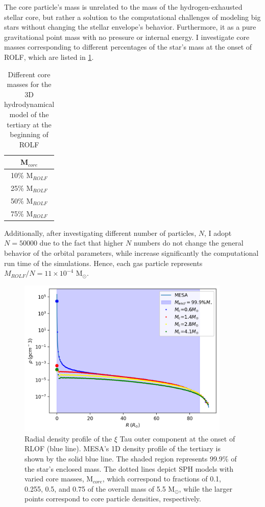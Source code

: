 The core particle's mass is unrelated to the mass of the hydrogen-exhausted stellar core, but rather a solution to the computational challenges of modeling big stars without changing the stellar envelope's behavior. Furthermore, it as a pure gravitational point mass with no pressure or internal energy. I investigate core masses corresponding to different percentages of the star's mass at the onset of ROLF, which are listed in \cref{tab:core_masses_ROLF}. 
\begin{table}[H]
    \centering
    \begin{tabular}{| c |}
       M$_{core}$  \\
       \hline
       10\% M$_{ROLF}$\\
       25\% M$_{ROLF}$\\
       50\% M$_{ROLF}$\\
       75\% M$_{ROLF}$
    \end{tabular}
    \caption{ Different core masses for the 3D hydrodynamical model of the tertiary at the beginning of ROLF}
    \label{tab:core_masses_ROLF}
\end{table}
Additionally, after investigating different number of particles, $N$, I adopt $N=50000$ due to the fact that higher $N$ numbers do not change the general behavior of the orbital parameters, while increase significantly the computational run time of the simulations.  Hence, each gas particle represents $M_{ROLF}/N = 11 \times 10^{-4}$ M$_{\odot}$.
\begin{figure}[H]
    \centering
    \includegraphics[width=0.9\textwidth]{Thesis/graphs/ROLF_density_profile.pdf}
    \caption{Radial density profile of the  $\xi$ Tau outer component at the onset of RLOF (blue line). MESA's 1D density profile of the tertiary is shown by the solid blue line. The shaded region represents 99.9\% of the star's enclosed mass. The dotted lines depict SPH models with varied core masses, M$_{core}$, which correspond to fractions of 0.1, 0.255, 0.5, and 0.75 of the overall mass of 5.5 M$_{\odot}$, while the larger points correspond to core particle densities, respectively.}
    \label{fig:stellar_density_ROLF}
\end{figure}

